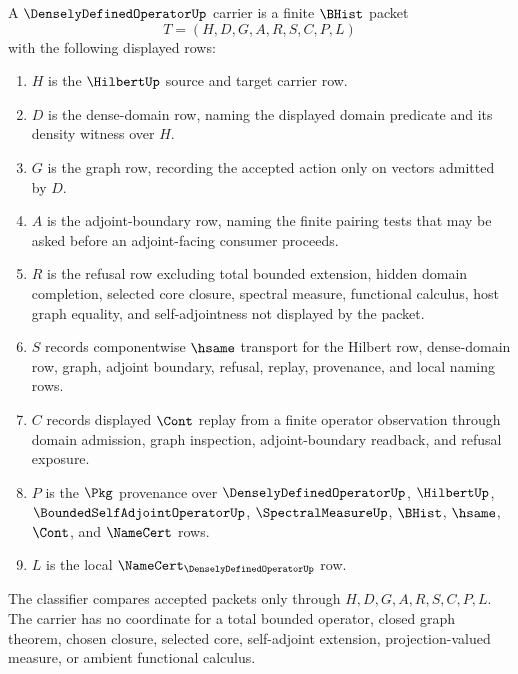 \begin{definition}
\label{def:densely-defined-operator-carrier}
A $\DenselyDefinedOperatorUp$ carrier is a finite $\BHist$ packet
$$
T=(H,D,G,A,R,S,C,P,L)
$$
with the following displayed rows:
\begin{enumerate}
\item $H$ is the $\HilbertUp$ source and target carrier row.
\item $D$ is the dense-domain row, naming the displayed domain predicate and its density witness over $H$.
\item $G$ is the graph row, recording the accepted action only on vectors admitted by $D$.
\item $A$ is the adjoint-boundary row, naming the finite pairing tests that may be asked before an adjoint-facing consumer proceeds.
\item $R$ is the refusal row excluding total bounded extension, hidden domain completion, selected core closure, spectral measure, functional calculus, host graph equality, and self-adjointness not displayed by the packet.
\item $S$ records componentwise $\hsame$ transport for the Hilbert row, dense-domain row, graph, adjoint boundary, refusal, replay, provenance, and local naming rows.
\item $C$ records displayed $\Cont$ replay from a finite operator observation through domain admission, graph inspection, adjoint-boundary readback, and refusal exposure.
\item $P$ is the $\Pkg$ provenance over $\DenselyDefinedOperatorUp$, $\HilbertUp$, $\BoundedSelfAdjointOperatorUp$, $\SpectralMeasureUp$, $\BHist$, $\hsame$, $\Cont$, and $\NameCert$ rows.
\item $L$ is the local $\NameCert_{\DenselyDefinedOperatorUp}$ row.
\end{enumerate}
The classifier compares accepted packets only through $H,D,G,A,R,S,C,P,L$. The carrier has no coordinate for a total bounded operator, closed graph theorem, chosen closure, selected core, self-adjoint extension, projection-valued measure, or ambient functional calculus.
\end{definition}

